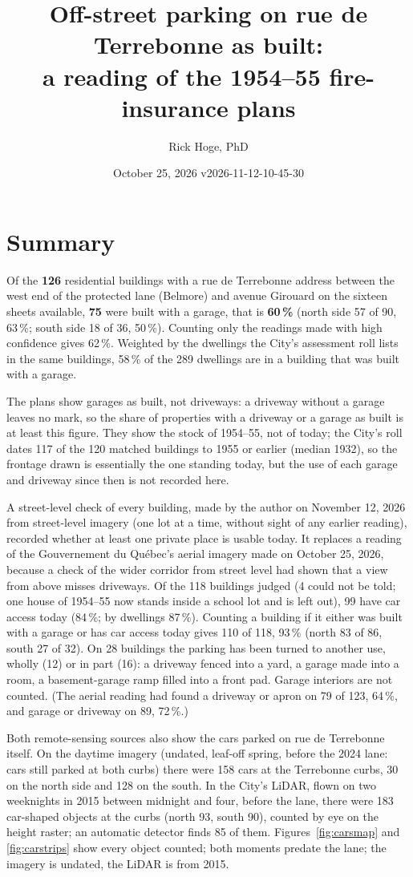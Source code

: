 \documentclass[11pt]{article}
\title{Off-street parking on rue de Terrebonne as built:\\ a reading of the 1954--55 fire-insurance plans}
\author{Rick Hoge, PhD}
\date{October 25, 2026 \quad\small v2026-11-12-10-45-30}
\begin{document}
\maketitle
\section*{Summary}
Of the \textbf{126} residential buildings with a rue de Terrebonne address between the west end of the protected lane (Belmore) and avenue Girouard on the sixteen sheets available, \textbf{75} were built with a garage, that is \textbf{60\,\%} (north side 57 of 90, 63\,\%; south side 18 of 36, 50\,\%). Counting only the readings made with high confidence gives 62\,\%. Weighted by the dwellings the City's assessment roll lists in the same buildings, 58\,\% of the 289 dwellings are in a building that was built with a garage.

The plans show garages as built, not driveways: a driveway without a garage leaves no mark, so the share of properties with a driveway or a garage as built is at least this figure. They show the stock of 1954--55, not of today; the City's roll dates 117 of the 120 matched buildings to 1955 or earlier (median 1932), so the frontage drawn is essentially the one standing today, but the use of each garage and driveway since then is not recorded here.

A street-level check of every building, made by the author on November 12, 2026 from street-level imagery (one lot at a time, without sight of any earlier reading), recorded whether at least one private place is usable today. It replaces a reading of the Gouvernement du Qu\'ebec's aerial imagery made on October 25, 2026, because a check of the wider corridor from street level had shown that a view from above misses driveways. Of the 118 buildings judged (4 could not be told; one house of 1954--55 now stands inside a school lot and is left out), 99 have car access today (84\,\%; by dwellings 87\,\%). Counting a building if it either was built with a garage or has car access today gives 110 of 118, 93\,\% (north 83 of 86, south 27 of 32). On 28 buildings the parking has been turned to another use, wholly (12) or in part (16): a driveway fenced into a yard, a garage made into a room, a basement-garage ramp filled into a front pad. Garage interiors are not counted. (The aerial reading had found a driveway or apron on 79 of 123, 64\,\%, and garage or driveway on 89, 72\,\%.)

Both remote-sensing sources also show the cars parked on rue de Terrebonne itself. On the daytime imagery (undated, leaf-off spring, before the 2024 lane: cars still parked at both curbs) there were 158 cars at the Terrebonne curbs, 30 on the north side and 128 on the south. In the City's LiDAR, flown on two weeknights in 2015 between midnight and four, before the lane, there were 183 car-shaped objects at the curbs (north 93, south 90), counted by eye on the height raster; an automatic detector finds 85 of them. Figures~\ref{fig:carsmap} and \ref{fig:carstrips} show every object counted; both moments predate the lane; the imagery is undated, the LiDAR is from 2015.
\end{document}
